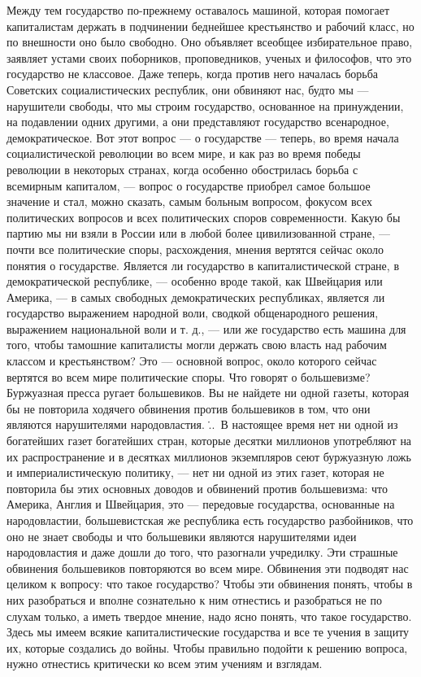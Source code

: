 \documentclass[12pt]{article}
\newcommand{\parnum}{(\arabic{parcount})}
\newcounter{parcount}
\newenvironment{parnumbers}{%
  \par%
  \everypar{\noindent \stepcounter{parcount}\marginpar[]{\parnum}}%
}{}
\begin{document}
\begin{parnumbers}
Между тем государство по-прежнему оставалось машиной, которая помогает капиталистам держать в подчинении беднейшее крестьянство и рабочий класс, но по внешности оно было свободно. Оно объявляет всеобщее избирательное право, заявляет устами своих поборников, проповедников, ученых и философов, что это государство не классовое. Даже теперь, когда против него началась борьба Советских социалистических республик, они обвиняют нас, будто мы — нарушители свободы, что мы строим государство, основанное на принуждении, на подавлении одних другими, а они представляют государство всенародное, демократическое. Вот этот вопрос — о государстве — теперь, во время начала социалистической революции во всем мире, и как раз во время победы революции в некоторых странах, когда особенно обострилась борьба с всемирным капиталом, — вопрос о государстве приобрел самое большое значение и стал, можно сказать, самым больным вопросом, фокусом всех политических вопросов и всех политических споров современности. Какую бы партию мы ни взяли в России или в любой более цивилизованной стране, — почти все политические споры, расхождения, мнения вертятся сейчас около понятия о государстве. Является ли государство в капиталистической стране, в демократической республике, — особенно вроде такой, как Швейцария или Америка, — в самых свободных демократических республиках, является ли государство выражением народной воли, сводкой общенародного решения, выражением национальной воли и т. д., — или же государство есть машина для того, чтобы тамошние капиталисты могли держать свою власть над рабочим классом и крестьянством? Это — основной вопрос, около которого сейчас вертятся во всем мире политические споры. Что говорят о большевизме? Буржуазная пресса ругает большевиков. Вы не найдете ни одной газеты, которая бы не повторила ходячего обвинения против большевиков в том, что они являются нарушителями народовластия. \...\ В настоящее время нет ни одной из богатейших газет богатейших стран, которые десятки миллионов употребляют на их распространение и в десятках миллионов экземпляров сеют буржуазную ложь и империалистическую политику, — нет ни одной из этих газет, которая не повторила бы этих основных доводов и обвинений против большевизма: что Америка, Англия и Швейцария, это — передовые государства, основанные на народовластии, большевистская же республика есть государство разбойников, что оно не знает свободы и что большевики являются нарушителями идеи народовластия и даже дошли до того, что разогнали учредилку. Эти страшные обвинения большевиков повторяются во всем мире. Обвинения эти подводят нас целиком к вопросу: что такое государство? Чтобы эти обвинения понять, чтобы в них разобраться и вполне сознательно к ним отнестись и разобраться не по слухам только, а иметь твердое мнение, надо ясно понять, что такое государство. Здесь мы имеем всякие капиталистические государства и все те учения в защиту их, которые создались до войны. Чтобы правильно подойти к решению вопроса, нужно отнестись критически ко всем этим учениям и взглядам.


\end{parnumbers}
\end{document}
